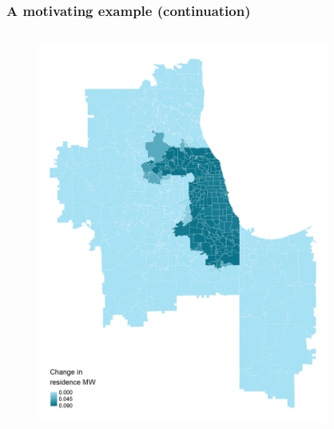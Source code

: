 \documentclass[aspectratio=169, t]{beamer}
\begin{document}
\begin{frame}[label = chi_example]
\frametitle{A motivating example (continuation)}
    \vspace{-6mm}
    \begin{columns}
        \begin{column}{0.50\textwidth}
            \vspace{-4mm}
            \begin{figure}
                \centering
                \includegraphics[scale = 0.36]{maps_events/output/chicago_2019-6_statutory_mw.png}
            \end{figure}   
        \end{column}
        \begin{column}{0.50\textwidth}
            \vspace{-4mm}
            \begin{figure}
                \centering

\end{figure}
\end{column}
\end{columns}
\end{frame}
\end{document}
